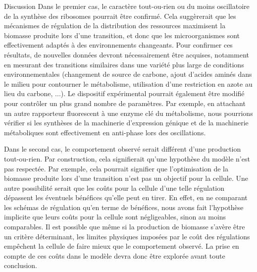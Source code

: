 \begin{chapter_summary}{Discussion}
Dans le premier cas, le caractère tout-ou-rien ou du moins oscillatoire de la synthèse des ribosomes pourrait être confirmé.
Cela suggèrerait que les mécanismes de régulation de la distribution des ressources maximisent la biomasse produite lors d'une transition, et donc que les microorganismes sont effectivement adaptés à des environnements changeants.
Pour confirmer ces résultats, de nouvelles données devront nécessairement être acquises, notamment en mesurant des transitions similaires dans une variété plus large de conditions environnementales (changement de source de carbone, ajout d'acides aminés dans le milieu pour contourner le métabolisme, utilisation d'une restriction en azote au lieu du carbone, ...).
Le dispositif expérimental pourrait également être modifié pour contrôler un plus grand nombre de paramètres.
Par exemple, en attachant un autre rapporteur fluorescent à une enzyme clé du métabolisme, nous pourrions vérifier si les synthèses de la machinerie d'expression génique et de la machinerie métaboliques sont effectivement en anti-phase lors des oscillations.

Dans le second cas, le comportement observé serait différent d'une production tout-ou-rien.
Par construction, cela signifierait qu'une hypothèse du modèle n'est pas respectée.
Par exemple, cela pourrait signifier que l'optimisation de la biomasse produite lors d'une transition n'est pas un objectif pour la cellule.
Une autre possibilité serait que les coûts pour la cellule d'une telle régulation dépassent les éventuels bénéfices qu'elle peut en tirer.
En effet, en ne comparant les schémas de régulation qu'en terme de bénéfices, nous avons fait l'hypothèse implicite que leurs coûts pour la cellule sont négligeables, sinon au moins comparables.
Il est possible que même si la production de biomasse s'avère être un critère déterminant, les limites physiques imposées par le coût des régulations empêchent la cellule de faire mieux que le comportement observé.
La prise en compte de ces coûts dans le modèle devra donc être explorée avant toute conclusion.


\end{chapter_summary}
